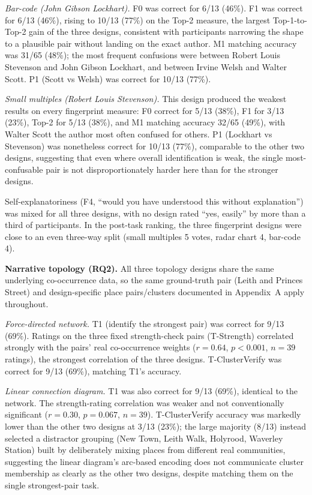 \documentclass[logo,msc]{infthesis}
\begin{document}
\emph{Bar-code (John Gibson Lockhart).} F0 was correct for 6/13 (46\%). F1 was correct for 6/13 (46\%), rising to 10/13 (77\%) on the Top-2 measure, the largest Top-1-to-Top-2 gain of the three designs, consistent with participants narrowing the shape to a plausible pair without landing on the exact author. M1 matching accuracy was 31/65 (48\%); the most frequent confusions were between Robert Louis Stevenson and John Gibson Lockhart, and between Irvine Welsh and Walter Scott. P1 (Scott vs Welsh) was correct for 10/13 (77\%).

\emph{Small multiples (Robert Louis Stevenson).} This design produced the weakest results on every fingerprint measure: F0 correct for 5/13 (38\%), F1 for 3/13 (23\%), Top-2 for 5/13 (38\%), and M1 matching accuracy 32/65 (49\%), with Walter Scott the author most often confused for others. P1 (Lockhart vs Stevenson) was nonetheless correct for 10/13 (77\%), comparable to the other two designs, suggesting that even where overall identification is weak, the single most-confusable pair is not disproportionately harder here than for the stronger designs.

Self-explanatoriness (F4, ``would you have understood this without explanation'') was mixed for all three designs, with no design rated ``yes, easily'' by more than a third of participants. In the post-task ranking, the three fingerprint designs were close to an even three-way split (small multiples 5 votes, radar chart 4, bar-code 4).

\textbf{Narrative topology (RQ2).} All three topology designs share the same underlying co-occurrence data, so the same ground-truth pair (Leith and Princes Street) and design-specific place pairs/clusters documented in Appendix~A apply throughout.

\emph{Force-directed network.} T1 (identify the strongest pair) was correct for 9/13 (69\%). Ratings on the three fixed strength-check pairs (T-Strength) correlated strongly with the pairs' real co-occurrence weights ($r=0.64$, $p<0.001$, $n=39$ ratings), the strongest correlation of the three designs. T-ClusterVerify was correct for 9/13 (69\%), matching T1's accuracy.

\emph{Linear connection diagram.} T1 was also correct for 9/13 (69\%), identical to the network. The strength-rating correlation was weaker and not conventionally significant ($r=0.30$, $p=0.067$, $n=39$). T-ClusterVerify accuracy was markedly lower than the other two designs at 3/13 (23\%); the large majority (8/13) instead selected a distractor grouping (New Town, Leith Walk, Holyrood, Waverley Station) built by deliberately mixing places from different real communities, suggesting the linear diagram's arc-based encoding does not communicate cluster membership as clearly as the other two designs, despite matching them on the single strongest-pair task.
\end{document}
